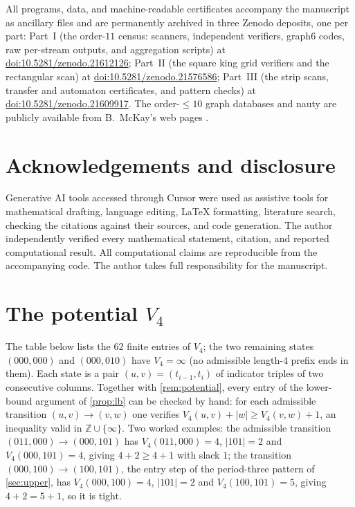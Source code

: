 \documentclass[11pt]{amsart}
\theoremstyle{remark}
\begin{document}
All programs, data, and machine-readable certificates accompany the manuscript as ancillary files and are permanently archived in three Zenodo deposits, one per part: Part~I (the order-$11$ census: scanners, independent verifiers, graph6 codes, raw per-stream outputs, and aggregation scripts) at \href{https://doi.org/10.5281/zenodo.21612126}{doi:10.5281/zenodo.21612126}; Part~II (the square king grid verifiers and the rectangular scan) at \href{https://doi.org/10.5281/zenodo.21576586}{doi:10.5281/zenodo.21576586}; Part~III (the strip scans, transfer and automaton certificates, and pattern checks) at \href{https://doi.org/10.5281/zenodo.21609917}{doi:10.5281/zenodo.21609917}.  The order-$\le 10$ graph databases and \textsf{nauty} are publicly available from B.~McKay's web pages \cite{NautySoftware}.

\section*{Acknowledgements and disclosure}

Generative AI tools accessed through Cursor were used as assistive tools for mathematical drafting, language editing, \LaTeX{} formatting, literature search, checking the citations against their sources, and code generation.  The author independently verified every mathematical statement, citation, and reported computational result.  All computational claims are reproducible from the accompanying code.  The author takes full responsibility for the manuscript.

\appendix

\section{The potential \texorpdfstring{$V_4$}{V4}}\label{app:v4}

The table below lists the $62$ finite entries of $V_4$; the two remaining states $(000,000)$ and $(000,010)$ have $V_4=\infty$ (no admissible length-$4$ prefix ends in them).  Each state is a pair $(u,v)=(t_{i-1},t_i)$ of indicator triples of two consecutive columns.  Together with \cref{rem:potential}, every entry of the lower-bound argument of \cref{prop:lb} can be checked by hand: for each admissible transition $(u,v)\to(v,w)$ one verifies $V_4(u,v)+|w|\ge V_4(v,w)+1$, an inequality valid in $\mathbb Z\cup\{\infty\}$.  Two worked examples: the admissible transition $(011,000)\to(000,101)$ has $V_4(011,000)=4$, $|101|=2$ and $V_4(000,101)=4$, giving $4+2\ge 4+1$ with slack $1$; the transition $(000,100)\to(100,101)$, the entry step of the period-three pattern of \cref{sec:upper}, has $V_4(000,100)=4$, $|101|=2$ and $V_4(100,101)=5$, giving $4+2=5+1$, so it is tight.
\end{document}

